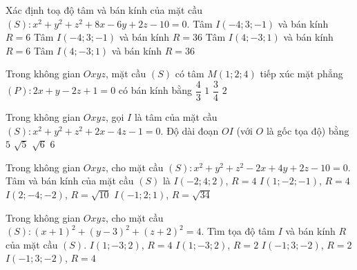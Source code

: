 \begin{ex}%
	Xác định toạ độ tâm và bán kính của  mặt cầu $(S)\colon x^2+y^2+z^2+8x-6y+2z-10=0$.
	\choice 
		{\True Tâm $I(-4;3;-1)$ và bán kính $R=6$} 
		{Tâm $I(-4;3;-1)$ và bán kính  $R=36$}
		{Tâm $I(4;-3;1)$ và bán kính  $R=6$}
		{Tâm $I(4;-3;1)$ và bán kính $R=36$} 
\end{ex}

\begin{ex}%
	Trong không gian $Oxyz$, mặt cầu $(S)$ có tâm $M(1;2;4)$ tiếp xúc mặt phẳng $(P)\colon2x+y-2z+1=0$ có  bán kính bằng
	 \choice
		{$\dfrac{4}{3}$} 
		{\True $1$} 
		{$\dfrac{3}{4}$} 
		{$2$} 
\end{ex}

\begin{ex}%
	Trong  không gian $Oxyz$, gọi $I$ là tâm của mặt cầu $(S)\colon x^2+y^2+z^2+2x-4z-1=0$. Độ dài đoạn $OI$ (với $O$ là gốc tọa độ) bằng
	 \choice
		{$5$} 
		 {\True $\sqrt{5}$}
		 {$\sqrt{6}$}
		{$6$} 
\end{ex}

\begin{ex}%
	Trong  không gian $Oxyz$, cho mặt cầu $(S)\colon x^2+y^2+z^2-2x+4y+2z-10=0$. Tâm và bán kính của mặt cầu $(S)$ là
	 \choice
		{$I(-2;4;2)$,  $R=4$}
		{\True  $I(1;-2;-1)$, $R=4$}
		 {$I(2;-4;-2)$, $R=\sqrt{10}$}
		{$I(-1;2;1)$, $R=\sqrt{34}$} 
\end{ex}

\begin{ex}%
	Trong không gian $Oxyz$, cho mặt cầu $\left(S\right)\colon\left(x+1\right)^2+\left(y-3\right)^2+\left(z+2\right)^2=4$. Tìm tọa  độ tâm $I$ và bán kính $R$ của mặt cầu $\left(S\right)$.
	\choice 
		{$I\left(1;-3;2\right)$, $R=4$} 
		{$I\left(1;-3;2\right)$, $R=2$} 
		 {\True $I\left(-1;3;-2\right)$, $R=2$}
		 {$I\left(-1;3;-2\right)$, $R=4$}
\end{ex}

